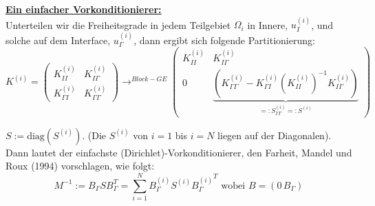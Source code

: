 \underline{\textbf{Ein einfacher Vorkonditionierer:}}\\
Unterteilen wir die Freiheitsgrade in jedem Teilgebiet $\Omega_i$ in Innere, $u^{(i)}_I$, und solche auf dem Interface, $u^{(i)}_\Gamma$, dann ergibt sich folgende Partitionierung:
\[K^{(i)}=
  \begin{pmatrix} 
    K^{(i)}_{II} & K^{(i)}_{I\Gamma} \\
    K^{(i)}_{\Gamma I} & K^{(i)}_{\Gamma \Gamma} 
  \end{pmatrix} 
 \longrightarrow^{Block-GE} 
 \begin{pmatrix} 
   K^{(i)}_{II} & K^{(i)}_{I\Gamma} \\
   0 & \underbrace{(K^{(i)}_{\Gamma \Gamma}-K^{(i)}_{\Gamma I} (K^{(i)}_{II})^{-1} K^{(i)}_{I \Gamma })}_{=: S^{(i)}_{\Gamma \Gamma}=: S^{(i)}}
\end{pmatrix} 
\]
\begin{definition}
  $S:= \text{diag} (S^{(i)}) $. (Die $S^{(i)}$ von $i=1$ bis $i=N$ liegen auf der Diagonalen). Dann lautet der einfachste (Dirichlet)-Vorkonditionierer, den Farheit, Mandel und Roux (1994) vorschlagen, wie folgt:
  \[M^{-1} := B_\Gamma S B^T_\Gamma = \sum_{i=1}^N B^{(i)}_\Gamma S^{(i)} {B^{(i)}_\Gamma}^T \text{ wobei } B=(0 \, B_\Gamma ) \]
\end{definition}

